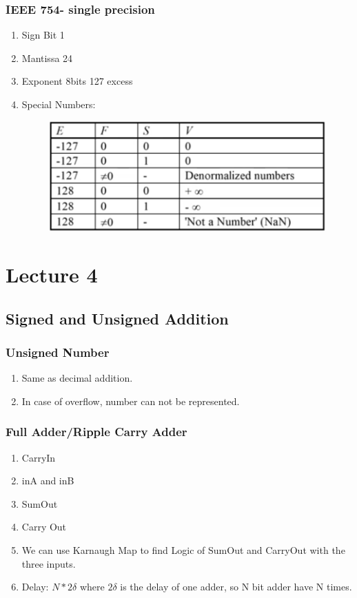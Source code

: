 \documentclass[11pt, a4paper]{article}
\begin{document}
\subsubsection{IEEE 754- single precision}
\begin{enumerate}
    \item Sign Bit 1
    \item Mantissa 24
    \item Exponent 8bits 127 excess
    \item Special Numbers:
    \begin{figure}[H]
        \centering
        \includegraphics[width=\textwidth]{Module 5/Notes/Pictures/IEEE754SinglePrecisionSpecialNumbers.png}
    \end{figure}
\end{enumerate}

\section{Lecture 4}
\subsection{Signed and Unsigned Addition}
\subsubsection{Unsigned Number}
\begin{enumerate}
    \item Same as decimal addition.
    \item In case of overflow, number can not be represented.
\end{enumerate}
\subsubsection{Full Adder/Ripple Carry Adder}
\begin{enumerate}
    \item CarryIn
    \item inA and inB
    \item SumOut
    \item Carry Out
    \item We can use Karnaugh Map to find Logic of SumOut and CarryOut with the three inputs.
    \item Delay: $N*2\delta$ where $2\delta$ is the delay of one adder, so N bit adder have N times.
\end{enumerate}
\end{document}
